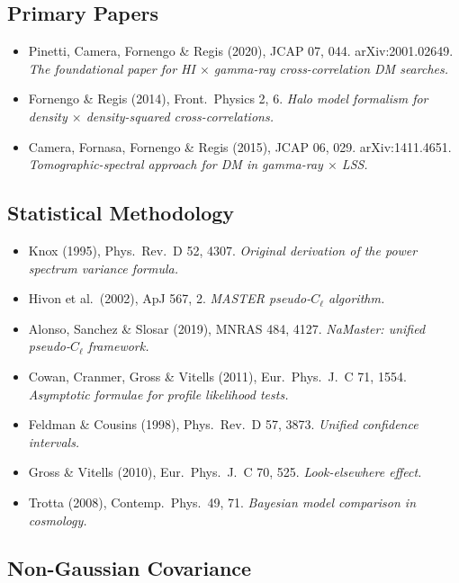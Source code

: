 \documentclass[10pt,a4paper]{article}
\newcommand{\Cl}{C_\ell}
\begin{document}
\subsection{Primary Papers}

\begin{itemize}[leftmargin=2em]
\item Pinetti, Camera, Fornengo \& Regis (2020), JCAP 07, 044. arXiv:2001.02649. \textit{The foundational paper for HI $\times$ gamma-ray cross-correlation DM searches.}
\item Fornengo \& Regis (2014), Front.\ Physics 2, 6. \textit{Halo model formalism for density $\times$ density-squared cross-correlations.}
\item Camera, Fornasa, Fornengo \& Regis (2015), JCAP 06, 029. arXiv:1411.4651. \textit{Tomographic-spectral approach for DM in gamma-ray $\times$ LSS.}
\end{itemize}

\subsection{Statistical Methodology}

\begin{itemize}[leftmargin=2em]
\item Knox (1995), Phys.\ Rev.\ D 52, 4307. \textit{Original derivation of the power spectrum variance formula.}
\item Hivon et al.\ (2002), ApJ 567, 2. \textit{MASTER pseudo-$\Cl$ algorithm.}
\item Alonso, Sanchez \& Slosar (2019), MNRAS 484, 4127. \textit{NaMaster: unified pseudo-$\Cl$ framework.}
\item Cowan, Cranmer, Gross \& Vitells (2011), Eur.\ Phys.\ J.\ C 71, 1554. \textit{Asymptotic formulae for profile likelihood tests.}
\item Feldman \& Cousins (1998), Phys.\ Rev.\ D 57, 3873. \textit{Unified confidence intervals.}
\item Gross \& Vitells (2010), Eur.\ Phys.\ J.\ C 70, 525. \textit{Look-elsewhere effect.}
\item Trotta (2008), Contemp.\ Phys.\ 49, 71. \textit{Bayesian model comparison in cosmology.}
\end{itemize}

\subsection{Non-Gaussian Covariance}
\end{document}
